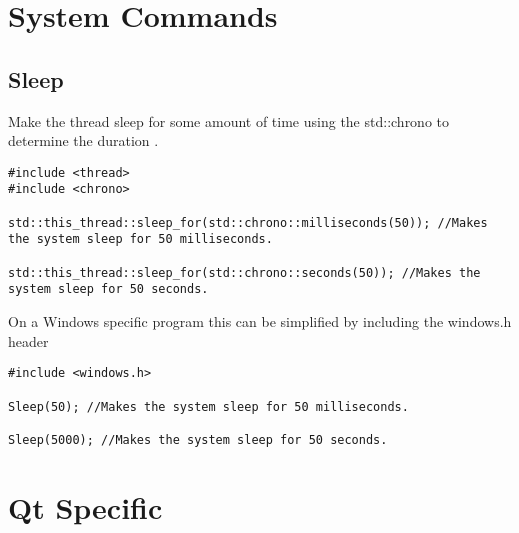 \section{System Commands}

\subsection*{Sleep}
Make the thread sleep for some amount of time using the std::chrono to determine the duration \cite{cpp:chrono}.
\begin{lstlisting}
#include <thread>
#include <chrono>

std::this_thread::sleep_for(std::chrono::milliseconds(50)); //Makes the system sleep for 50 milliseconds.

std::this_thread::sleep_for(std::chrono::seconds(50)); //Makes the system sleep for 50 seconds.
\end{lstlisting}

On a Windows specific program this can be simplified by including the windows.h header
\begin{lstlisting}
#include <windows.h>

Sleep(50); //Makes the system sleep for 50 milliseconds.

Sleep(5000); //Makes the system sleep for 50 seconds.
\end{lstlisting}


\section{Qt Specific}


